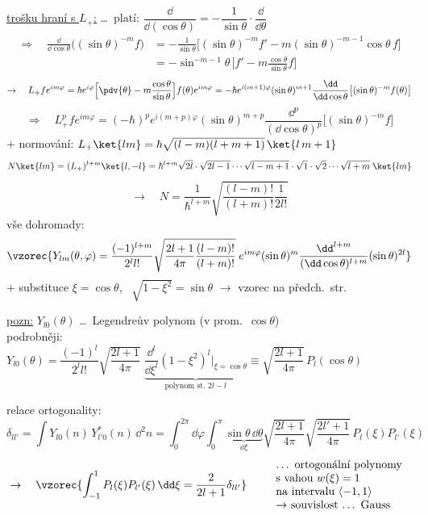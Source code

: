 \underline{trošku hraní s $L_+$:} \dots\ platí: \quad $\dfrac{\dd}{\dd(\cos\theta)} = -\dfrac{1}{\sin\theta}\cdot\dfrac{\dd}{\dd\theta}$
\begin{align*}
  \Rightarrow\quad \frac{\dd}{\dd\cos\theta}\big((\sin\theta)^{-m}f\big) &= -\frac{1}{\sin\theta}\big[(\sin\theta)^{-m}f' - m(\sin\theta)^{-m-1}\cos\theta\,f\big] \\
  &= -\sin^{-m-1}\theta\,\Big[f' - m\frac{\cos\theta}{\sin\theta}f\Big]
\end{align*}
\[
  \to\quad L_+fe^{im\varphi} = \hbar e^{i\varphi}\Big[\pdv{\theta} - m\frac{\cos\theta}{\sin\theta}\Big]f(\theta)e^{im\varphi}
  = -\hbar e^{i(m+1)\varphi}(\sin\theta)^{m+1}\frac{\dd}{\dd\cos\theta}\big[(\sin\theta)^{-m}f(\theta)\big]
\]
\[
  \Rightarrow\quad L_+^p fe^{im\varphi} = (-\hbar)^p e^{i(m+p)\varphi}(\sin\theta)^{m+p}\frac{\dd^p}{(\dd\cos\theta)^p}\big[(\sin\theta)^{-m}f\big]
\]
+ normování: \quad $L_+\ket{lm} = \hbar\sqrt{(l-m)(l+m+1)}\,\ket{l\,m+1}$
\[
  N\ket{lm} = (L_+)^{l+m}\ket{l,-l} = \hbar^{l+m}\sqrt{2l}\cdot\sqrt{2l-1}\cdots\sqrt{l-m+1}\cdot\sqrt1\cdot\sqrt2\cdots\sqrt{l+m}\;\ket{lm}
\]
\[
  \to\quad N = \frac{1}{\hbar^{l+m}}\sqrt{\frac{(l-m)!}{(l+m)!}\frac{1}{2l!}}
\]
vše dohromady:
\[
  \vzorec{Y_{lm}(\theta,\varphi) = \frac{(-1)^{l+m}}{2^l l!}\sqrt{\frac{2l+1}{4\pi}\frac{(l-m)!}{(l+m)!}}\;e^{im\varphi}(\sin\theta)^m\frac{\dd^{l+m}}{(\dd\cos\theta)^{l+m}}(\sin\theta)^{2l}}
\]
\quad + substituce \quad $\xi = \cos\theta$, \ $\sqrt{1-\xi^2} = \sin\theta$ \quad $\to$ vzorec na předch.\ str.

\underline{pozn:} $Y_{l0}(\theta)$ \dots\ Legendreův polynom (v prom.\ $\cos\theta$) \\
podrobněji: \quad
$Y_{l0}(\theta) = \dfrac{(-1)^l}{2^l l!}\sqrt{\dfrac{2l+1}{4\pi}}\;\underbrace{\dfrac{\dd^l}{\dd\xi^l}(1-\xi^2)^l\Big|_{\xi=\cos\theta}}_{\text{polynom st.\ } 2l-l}
 \equiv \sqrt{\dfrac{2l+1}{4\pi}}\,P_l(\cos\theta)$

relace ortogonality:
\[
  \delta_{ll'} = \int Y_{l0}(n)\,Y_{l'0}^*(n)\,\dd^2n = \int_0^{2\pi}\dd\varphi\int_0^\pi\underbrace{\sin\theta\,\dd\theta}_{\dd\xi}\sqrt{\frac{2l+1}{4\pi}}\sqrt{\frac{2l'+1}{4\pi}}\,P_l(\xi)P_{l'}(\xi)
\]
\[
  \to\quad \vzorec{\int_{-1}^{1}P_l(\xi)P_{l'}(\xi)\,\dd\xi = \frac{2}{2l+1}\delta_{ll'}}
  \qquad \begin{tabular}{l}\dots\ ortogonální polynomy \\ s vahou $w(\xi) = 1$ \\ na intervalu $\langle -1,1\rangle$ \\ $\to$ souvislost \dots\ Gauss\end{tabular}
\]

